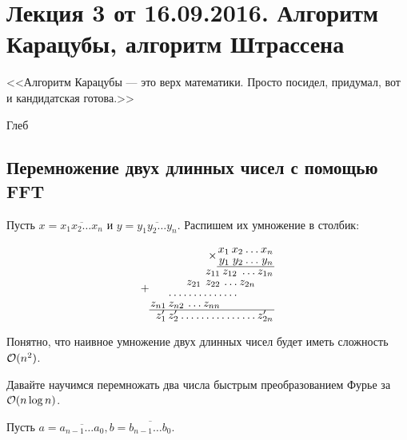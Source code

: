 
% 

\section{Лекция 3 от 16.09.2016. Алгоритм Карацубы, алгоритм Штрассена}

\epigraph{<<Алгоритм Карацубы --- это верх математики. Просто
посидел, придумал, вот и кандидатская готова.>>}
{Глеб}

\subsection{Перемножение двух длинных чисел с помощью FFT}

Пусть $x = \overline{x_1 x_2 \ldots x_n}$ и $y = \overline{y_1 y_2 \ldots y_n}$. Распишем их умножение в столбик:
\begin{center}
  \[
  \renewcommand{\arraystretch}{0.8}
  \arraycolsep=1pt
  \begin{array}{r}
  \times\begin{array}{rrrr}
  x_1 & x_2 & \ldots & x_n \\
  y_1 & y_2 & \ldots & y_n \\
  \hline
  \end{array}
  \\
  +\begin{array}{rrrrrrr}
  & & & z_{11} & z_{12} & \ldots & z_{1n} \\
  & & z_{21} & z_{22} & \ldots & z_{2n} & \\
  & \hdotsfor{4} & & \\
  z_{n1} & z_{n2} & \ldots & z_{nn} & & & \\
  \hline
  \end{array}
  \\
  \begin{array}{rrrrrrrr}
  z'_{1} & z'_{2} & \dots & \dots & \dots & \dots & \dots & z'_{2n}\\
  \end{array}
  \end{array}\]
\end{center}

Понятно, что наивное умножение двух длинных чисел будет иметь сложность $\mathcal{O}(n^2)$.

Давайте научимся перемножать два числа быстрым преобразованием Фурье за $\mathcal{O}(n\log n)$.

Пусть $a = \overline{a_{n - 1}\ldots a_0}, b = \overline{b_{n - 1}\ldots b_0}$.

